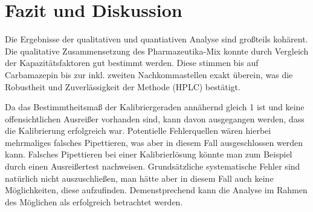\section{Fazit und Diskussion}

  Die Ergebnisse der qualitativen und quantiativen Analyse sind großteils kohärent. Die qualitative Zusammensetzung des Pharmazeutika-Mix konnte durch Vergleich der Kapazitätsfaktoren gut bestimmt werden. Diese stimmen bis auf Carbamazepin bis zur inkl. zweiten Nachkommastellen exakt überein, was die Robustheit und Zuverlässigkeit der Methode (HPLC) bestätigt. 
  
  Da das Bestimmtheitsmaß der Kalibriergeraden annähernd gleich 1 ist und keine offensichtlichen Ausreißer vorhanden sind, kann davon ausgegangen werden, dass die Kalibrierung erfolgreich war. Potentielle Fehlerquellen wären hierbei mehrmaliges falsches Pipettieren, was aber in diesem Fall ausgeschlossen werden kann. Falsches Pipettieren bei einer Kalibrierlösung könnte man zum Beispiel durch einen Ausreißertest nachweisen. Grundsätzliche systematische Fehler sind natürlich nicht auszuschließen, man hätte aber in diesem Fall auch keine Möglichkeiten, diese aufzufinden. Demenstprechend kann die Analyse im Rahmen des Möglichen als erfolgreich betrachtet werden.  